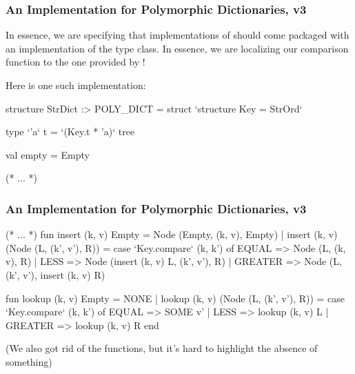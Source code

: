 \documentclass[aspectratio=169]{beamer}
\begin{document}
\begin{frame}[fragile]
  \frametitle{An Implementation for Polymorphic Dictionaries, v3}

  In essence, we are specifying that implementations of 
  should come packaged with an implementation of the  type class.
  In essence, we are localizing our comparison function to the one provided
  by !

  \pause
  \vspace{\fill}

  Here is one such implementation:

  \begin{codeblock}
    structure StrDict :> POLY_DICT =
      struct
        `structure Key = StrOrd`

        type `'a` t = `(Key.t * 'a)` tree

        val empty = Empty

      (* ... *)
  \end{codeblock}
\end{frame}

\begin{frame}[fragile]
  \frametitle{An Implementation for Polymorphic Dictionaries, v3}

  \small
  \begin{codeblock}
    (* ... *)
      fun insert (k, v) Empty = Node (Empty, (k, v), Empty)
        | insert (k, v) (Node (L, (k', v'), R)) =
            case `Key.compare` (k, k') of
              EQUAL   => Node (L, (k, v), R)
            | LESS    => Node (insert (k, v) L, (k', v'), R)
            | GREATER => Node (L, (k', v'), insert (k, v) R)

      fun lookup (k, v) Empty = NONE
        | lookup (k, v) (Node (L, (k', v'), R)) =
            case `Key.compare` (k, k') of
              EQUAL   => SOME v'
            | LESS    => lookup (k, v) L
            | GREATER => lookup (k, v) R
    end
  \end{codeblock}

  \pause
  \vspace{\fill}

  (We also got rid of the  functions, but it's hard to highlight the
  absence of something)
\end{frame}
\end{document}
